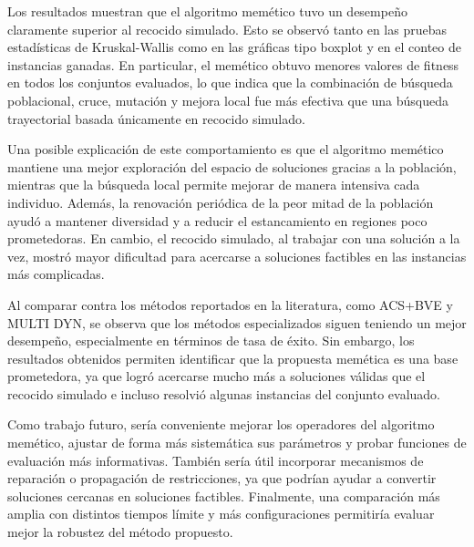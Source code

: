 \documentclass{article}
\begin{document}
Los resultados muestran que el algoritmo memético tuvo un desempeño claramente superior al recocido simulado. Esto se observó tanto en las pruebas estadísticas de Kruskal-Wallis como en las gráficas tipo boxplot y en el conteo de instancias ganadas. En particular, el memético obtuvo menores valores de fitness en todos los conjuntos evaluados, lo que indica que la combinación de búsqueda poblacional, cruce, mutación y mejora local fue más efectiva que una búsqueda trayectorial basada únicamente en recocido simulado.

Una posible explicación de este comportamiento es que el algoritmo memético mantiene una mejor exploración del espacio de soluciones gracias a la población, mientras que la búsqueda local permite mejorar de manera intensiva cada individuo. Además, la renovación periódica de la peor mitad de la población ayudó a mantener diversidad y a reducir el estancamiento en regiones poco prometedoras. En cambio, el recocido simulado, al trabajar con una solución a la vez, mostró mayor dificultad para acercarse a soluciones factibles en las instancias más complicadas.

Al comparar contra los métodos reportados en la literatura, como ACS+BVE y MULTI DYN, se observa que los métodos especializados siguen teniendo un mejor desempeño, especialmente en términos de tasa de éxito. Sin embargo, los resultados obtenidos permiten identificar que la propuesta memética es una base prometedora, ya que logró acercarse mucho más a soluciones válidas que el recocido simulado e incluso resolvió algunas instancias del conjunto evaluado.

Como trabajo futuro, sería conveniente mejorar los operadores del algoritmo memético, ajustar de forma más sistemática sus parámetros y probar funciones de evaluación más informativas. También sería útil incorporar mecanismos de reparación o propagación de restricciones, ya que podrían ayudar a convertir soluciones cercanas en soluciones factibles. Finalmente, una comparación más amplia con distintos tiempos límite y más configuraciones permitiría evaluar mejor la robustez del método propuesto.

\uline{\hfill \phantom{-} \hfill}


\end{document}
